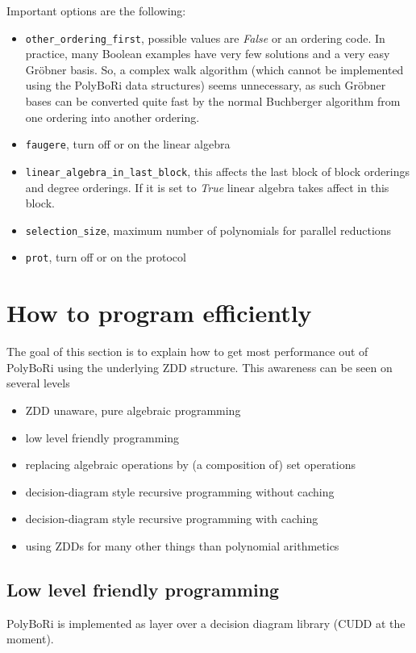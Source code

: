 \documentclass[]{article}
\newcommand{\PolyBoRi}{{\sc PolyBoRi}\xspace}
\newcommand{\Groebner}{Gröbner\xspace}
\newcommand{\CUDD}{{CUDD}\xspace}
\newcommand{\pythonconstant}[1]{\textit{#1}\xspace}
\begin{document}
Important options are the following:
\begin{itemize}
    \item \verb|other_ordering_first|, possible values are \pythonconstant{False} or an ordering code.
    In practice, many Boolean examples have very few solutions and a very easy \Groebner basis. So, a complex walk algorithm (which cannot be implemented using the \PolyBoRi data structures) seems unnecessary, as such \Groebner bases can be converted quite fast by the 
    normal Buchberger algorithm from one ordering into another ordering.
    \item \verb|faugere|, turn off or on the linear algebra
    \item \verb|linear_algebra_in_last_block|, this affects the last block of block orderings and degree orderings. If it is set to \pythonconstant{True} linear algebra takes affect in this block.
    \item \verb|selection_size|, maximum number of polynomials for parallel reductions
    \item \verb|prot|, turn off or on the protocol
\end{itemize}
\section{How to program efficiently}
The goal of this section is to explain how to get most performance out of \PolyBoRi using the underlying ZDD structure.
This awareness can be seen on several levels
\begin{itemize}
    \item ZDD unaware, pure algebraic programming 
    \item low level friendly programming
    \item replacing algebraic operations by (a composition of) set operations
    \item decision-diagram style recursive programming without caching
    \item decision-diagram style recursive programming with caching
    \item using ZDDs for many other things than polynomial arithmetics
\end{itemize}
\subsection{Low level friendly programming}
\label{low-level-friendly}
\PolyBoRi is implemented as layer over a decision diagram library (\CUDD at the moment).
\end{document}
